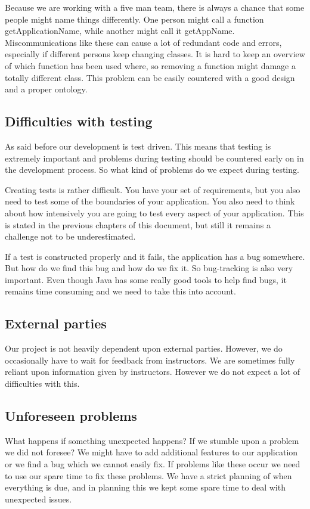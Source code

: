 \documentclass[a4paper]{article}
\begin{document}
Because we are working with a five man team, there is always a chance that some people might name things differently. One person might call a function getApplicationName, while another might call it getAppName. Miscommunications like these can cause a lot of redundant code and errors, especially if different persons keep changing classes. It is hard to keep an overview of which function has been used where, so removing a function might damage a totally different class. This problem can be easily countered with a good design and a proper ontology.

\subsection{Difficulties with testing}
As said before our development is test driven. This means that testing is extremely important and problems during testing should be countered early on in the development process. So what kind of problems do we expect during testing. 

Creating tests is rather difficult. You have your set of requirements, but you also need to test some of the boundaries of your application. You also need to think about how intensively you are going to test every aspect of your application. This is stated in the previous chapters of this document, but still it remains a challenge not to be underestimated.

If a test is constructed properly and it fails, the application has a bug somewhere. But how do we find this bug and how do we fix it. So bug-tracking is also very important. Even though Java has some really good tools to help find bugs, it remains time consuming and we need to take this into account.

\subsection{External parties}
Our project is not heavily dependent upon external parties. However, we do occasionally have to wait for feedback from instructors. We are sometimes fully reliant upon information given by instructors. However we do not expect a lot of difficulties with this.

\subsection{Unforeseen problems}
What happens if something unexpected happens? If we stumble upon a problem we did not foresee? We might have to add additional features to our application or we find a bug which we cannot easily fix. If problems like these occur we need to use our spare time to fix these problems. We have a strict planning of when everything is due, and in planning this we kept some spare time to deal with unexpected issues.
\end{document}
